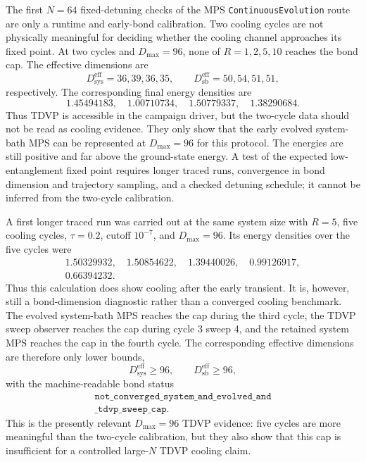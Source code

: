 \documentclass[aps,pra,twocolumn,superscriptaddress,nolongbibliography,nobalancelastpage,10pt]{revtex4-2}
\begin{document}
The first \(N=64\) fixed-detuning checks of the MPS
\texttt{ContinuousEvolution} route are only a runtime and early-bond
calibration.  Two cooling cycles are not physically meaningful for deciding
whether the cooling channel approaches its fixed point.  At two cycles and
\(D_{\max}=96\), none of \(R=1,2,5,10\) reaches the bond cap.  The effective
dimensions are
\[
	D_{\mathrm{sys}}^{\mathrm{eff}}=36,39,36,35,\qquad
	D_{\mathrm{sb}}^{\mathrm{eff}}=50,54,51,51,
\]
respectively.  The corresponding final energy densities are
\[
	1.45494183,\quad 1.00710734,\quad 1.50779337,\quad 1.38290684.
\]
Thus TDVP is accessible in the campaign driver, but the two-cycle data should
not be read as cooling evidence.  They only show that the early evolved
system-bath MPS can be represented at \(D_{\max}=96\) for this protocol.  The
energies are still positive and far above the ground-state energy.  A test of
the expected low-entanglement fixed point requires longer traced runs,
convergence in bond dimension and trajectory sampling, and a checked detuning
schedule; it cannot be inferred from the two-cycle calibration.

A first longer traced run was carried out at the same system size with
\(R=5\), five cooling cycles, \(\tau=0.2\), cutoff \(10^{-7}\), and
\(D_{\max}=96\).  Its energy densities over the five cycles were
\begin{align*}
	1.50329932,\quad 1.50854622,\quad 1.39440026,\quad
	0.99126917,\\
	0.66394232.
\end{align*}
Thus this calculation does show cooling after the early transient.  It is,
however, still a bond-dimension diagnostic rather than a converged cooling
benchmark.  The evolved system-bath MPS reaches the cap during the third
cycle, the TDVP sweep observer reaches the cap during cycle 3 sweep 4, and the
retained system MPS reaches the cap in the fourth cycle.  The corresponding
effective dimensions are therefore only lower bounds,
\[
	D_{\mathrm{sys}}^{\mathrm{eff}}\geq 96,\qquad
	D_{\mathrm{sb}}^{\mathrm{eff}}\geq 96,
\]
with the machine-readable bond status
\[
\begin{gathered}
	\texttt{not\_converged\_system\_and\_evolved\_and}\\
	\texttt{\_tdvp\_sweep\_cap}.
\end{gathered}
\]
This is the presently relevant \(D_{\max}=96\) TDVP evidence: five cycles are
more meaningful than the two-cycle calibration, but they also show that this
cap is insufficient for a controlled large-\(N\) TDVP cooling claim.
\end{document}
